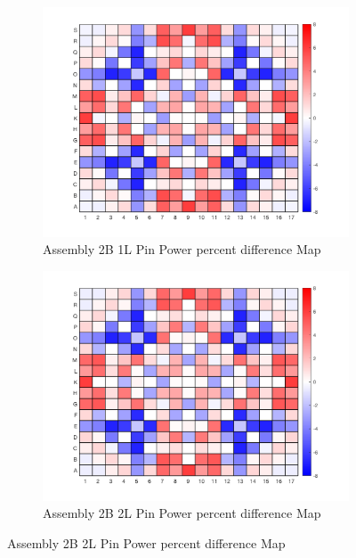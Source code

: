 \documentclass[12pt]{article}
\begin{document}
\begin{figure}[htb!]

        \begin{subfigure}{.5\textwidth} %
            \centering
            \includegraphics[scale=0.46]{Figures/2B_1L_pinpowerDiff.png} 
            \caption{Assembly 2B 1L Pin Power percent difference Map}
            \label{fig:sub-first}
        \end{subfigure}
        \begin{subfigure}{.5\textwidth}
            \centering
            \includegraphics[scale=0.46]{Figures/2B_2L_pinpowerDiff.png} 
            \caption{Assembly 2B 2L Pin Power percent difference Map}
            \label{fig:sub-second}
        \end{subfigure}


\end{figure}
\end{document}
